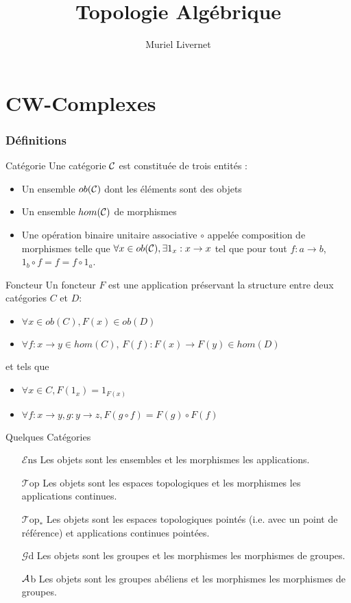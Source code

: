 \documentclass{cours}
\title{Topologie Algébrique}
\author{Muriel Livernet}
\newcommand{\Ens}{\mathcal{E}\mathrm{ns}}
\newcommand{\Top}{\mathcal{T}\mathrm{op}}
\newcommand{\Gp}{\mathcal{G}\mathrm{d}}
\begin{document}
\part{CW-Complexes}
\section{Définitions}
\begin{définition}{Catégorie}{}
    Une catégorie $\mathcal{C}$ est constituée de trois entités :
    \begin{itemize}
        \item Un ensemble $ob(\mathcal{C})$ dont les éléments sont des objets
        \item Un ensemble $hom(\mathcal{C})$ de morphismes
        \item Une opération binaire unitaire associative $\circ$ appelée composition de morphismes telle que $\forall x \in ob(\mathcal{C}), \exists 1_{x} : x \to x$ tel que pour tout $f: a\to b$, $1_{b} \circ f = f = f \circ 1_{a}$.
    \end{itemize} 
\end{définition}

\begin{définition}{Foncteur}{}
    Un foncteur $F$ est une application préservant la structure entre deux catégories $C$ et $D$:
    \begin{itemize}
        \item $\forall x \in ob(C), F(x) \in ob(D)$
        \item $\forall f : x\to y \in hom(C)$, $F(f) : F(x) \to F(y) \in hom(D)$
    \end{itemize}
    et tels que 
    \begin{itemize}
        \item $\forall x \in C, F(1_{x}) = 1_{F(x)}$
        \item $\forall f:x\to y, g : y \to z, F(g \circ f) = F(g) \circ F(f)$
    \end{itemize}
\end{définition}

\begin{définition}{Quelques Catégories}{}
    \begin{itemize}
        \item[$\Ens$] Les objets sont les ensembles et les morphismes les applications.
        \item[$\Top$] Les objets sont les espaces topologiques et les morphismes les applications continues.
        \item[$\Top_{*}$] Les objets sont les espaces topologiques pointés (i.e. avec un point de référence) et applications continues pointées.
        \item[$\Gp$] Les objets sont les groupes et les morphismes les morphismes de groupes.
        \item[$\mathcal{A}$b] Les objets sont les groupes abéliens et les morphismes les morphismes de groupes.
    \end{itemize}
\end{définition}
\end{document}
